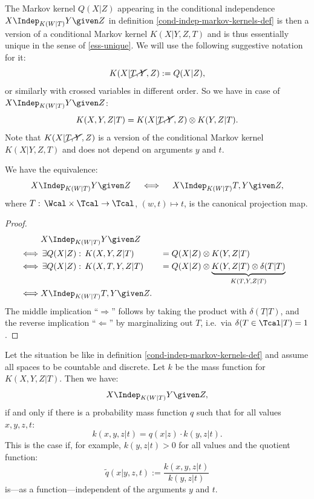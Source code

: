 \begin{Not}
        The Markov kernel $Q(X|Z)$ appearing in the conditional independence $X \Indep_{K(W|T)} Y \given Z$ in definition \ref{cond-indep-markov-kernels-def} is then a version of a conditional Markov kernel $K(X|Y,Z,T)$ and is thus essentially unique in the sense of \ref{ess-unique}.
    We will use the following suggestive notation for it:
    \[ K(X|\cancel{T,Y},Z) := Q(X|Z),\]
    or similarly with crossed variables in different order.
    So we have in case of $X \Indep_{K(W|T)} Y \given Z$:
\[ K(X,Y,Z|T) = K(X|\cancel{T,Y},Z)\otimes K(Y,Z|T).\]
Note that $K(X|\cancel{T,Y},Z)$ is a version of the conditional Markov kernel $K(X|Y,Z,T)$ and does not depend on arguments $y$ and $t$.
\end{Not}

\begin{Rem}
    \label{add-T}
 We have the equivalence:
 \[X \Indep_{K(W|T) } Y \given Z \quad\iff \quad X \Indep_{K(W|T)} T,Y \given Z,\]
where $T :\, \Wcal \times \Tcal \to \Tcal$, $(w,t) \mapsto t$, is the canonical projection map.
\begin{proof}
\begin{align*}
&X \Indep_{K(W|T)} Y \given Z \\
\iff &\, \exists Q(X|Z):\, K(X,Y,Z|T) &&= Q(X|Z) \otimes K(Y,Z|T)\\
\iff &\, \exists Q(X|Z):\, K(X,T,Y,Z|T) &&= Q(X|Z)\otimes \underbrace{ K(Y,Z|T)  \otimes  \delta(T|T)  }_{K(T,Y,Z|T)}\\
\iff& X \Indep_{K(W|T)} T,Y \given Z.
\end{align*}
The middle implication ``$\Longrightarrow$'' follows by taking the product with $\delta(T|T)$, 
and the reverse implication ``$\Longleftarrow$'' by marginalizing out $T$, i.e.\ via $\delta(T \in \Tcal|T)=1$.
\end{proof}
\end{Rem}


\begin{Eg}
    Let the situation be like in definition \ref{cond-indep-markov-kernels-def} and assume all spaces to be countable and discrete.
    Let $k$ be the mass function for $K(X,Y,Z|T)$.
    Then we have: 
    \[X \Indep_{K(W|T)} Y \given Z, \]
    if and only if there is a probability mass function $q$ such that for all values $x,y,z,t$:
    \[ k(x,y,z|t) = q(x|z) \cdot k(y,z|t). \]
    This is the case if, for example, $k(y,z|t) >0$ for all values and the quotient function:
    \[ \tilde q(x|y,z,t) :=  \frac{k(x,y,z|t)}{k(y,z|t)}   \]
    is---as a function---independent of the arguments $y$ and $t$. %
\end{Eg}

